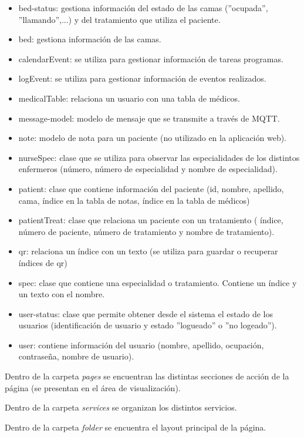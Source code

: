 \begin{itemize}
\item bed-status: gestiona información del estado de las camas  (''ocupada'', ''llamando'',...) y del tratamiento que utiliza el paciente.
\item bed: gestiona información de las camas.
\item calendarEvent: se utiliza para gestionar información de tareas programas.
\item logEvent: se utiliza para gestionar información de eventos realizados.
\item medicalTable: relaciona un usuario con una tabla de médicos.
\item message-model: modelo de mensaje que se transmite a través de MQTT.
\item note: modelo de nota para un paciente (no utilizado en la aplicación web).
\item nurseSpec: clase que se utiliza para observar las especialidades de los distintos enfermeros (número, número de especialidad y nombre de especialidad).
\item patient: clase que contiene información del paciente (id, nombre, apellido, cama, índice en la tabla de notas, índice en la tabla de médicos)
\item patientTreat: clase que relaciona un paciente con un tratamiento ( índice, número de paciente, número de tratamiento y nombre de tratamiento).
\item qr: relaciona un índice con un texto (se utiliza para guardar o recuperar índices de qr)
\item spec: clase que contiene una especialidad o tratamiento. Contiene un índice y un texto con el nombre.
\item user-status: clase que permite obtener desde el sistema el estado de los usuarios (identificación de usuario y estado ''logueado'' o ''no logeado'').
\item user: contiene información del usuario (nombre, apellido, ocupación, contraseña, nombre de usuario).
 
\end{itemize}


Dentro de la carpeta \textit{pages} se encuentran las distintas secciones de acción de la página (se presentan en el área de visualización).

Dentro de la carpeta \textit{services} se organizan los distintos servicios.

Dentro de la carpeta \textit{folder} se encuentra el layout principal de la página.

